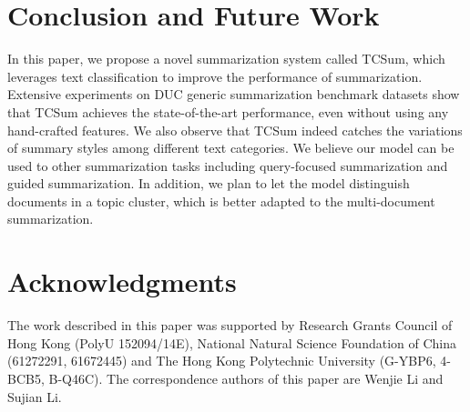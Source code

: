 \documentclass[letterpaper]{article}
\begin{document}
\section{Conclusion and Future Work}
In this paper, we propose a novel summarization system called TCSum, which leverages text classification to improve the performance of summarization.
Extensive experiments on DUC generic summarization benchmark datasets show that TCSum achieves the state-of-the-art performance, even without using any hand-crafted features.
We also observe that TCSum indeed catches the variations of summary styles among different text categories.
We believe our model can be used to other summarization tasks including query-focused summarization and guided summarization. 
In addition, we plan to let the model distinguish documents in a topic cluster, which is better adapted to the multi-document summarization.

\section{ Acknowledgments}
The work described in this paper was supported by Research Grants Council of Hong Kong (PolyU 152094/14E), National Natural Science Foundation of China (61272291, 61672445) and The Hong Kong Polytechnic University (G-YBP6, 4-BCB5, B-Q46C).
The correspondence authors of this paper are Wenjie Li and Sujian Li.



\end{document}
